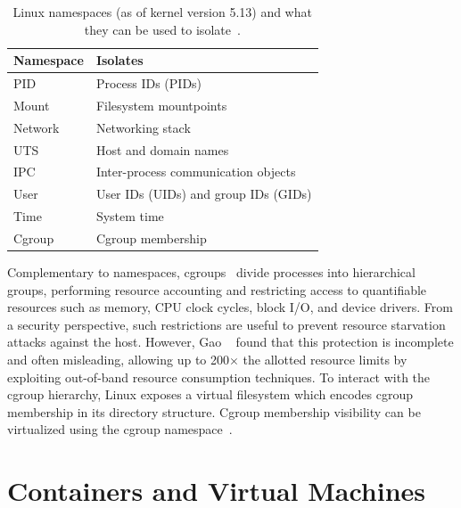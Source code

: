 \begin{table}
\begin{tabular}{lp{3in}}
    \toprule
    Namespace & Isolates \\
    \midrule
    \multirow{1}{*}{PID} & Process IDs (PIDs)\\
    \multirow{1}{*}{Mount} & Filesystem mountpoints\\
    \multirow{1}{*}{Network} & Networking stack\\
    \multirow{1}{*}{UTS} & Host and domain names\\
    \multirow{1}{*}{IPC} & Inter-process communication objects\\
    \multirow{1}{*}{User} & User IDs (UIDs) and group IDs (GIDs)\\
    \multirow{1}{*}{Time} & System time\\
    \multirow{1}{*}{Cgroup} & Cgroup membership\\
    \bottomrule
\end{tabular}
\caption[Linux namespaces]{
  Linux namespaces (as of kernel version 5.13) and what they can be used to isolate~\cite{linux_namespaces}.
}
\label{tab:namespaces}
\end{table}

Complementary to namespaces, cgroups~\cite{cgroups, gao2019_houdini} divide processes into hierarchical
groups, performing resource accounting and restricting access to quantifiable resources
such as memory, CPU clock cycles, block I/O, and device drivers. From a security
perspective, such restrictions are useful to prevent resource starvation attacks against
the host. However, Gao \etal~\cite{gao2019_houdini} found that this protection is
incomplete and often misleading, allowing up to 200$\times$ the allotted resource limits
by exploiting out-of-band resource consumption techniques. To interact with the cgroup hierarchy,
Linux exposes a virtual filesystem which encodes cgroup membership in its directory structure.
Cgroup membership visibility can be virtualized using the cgroup namespace~\cite{cgroups}.



\section{Containers and Virtual Machines}%
\label{s:containers-bg}


